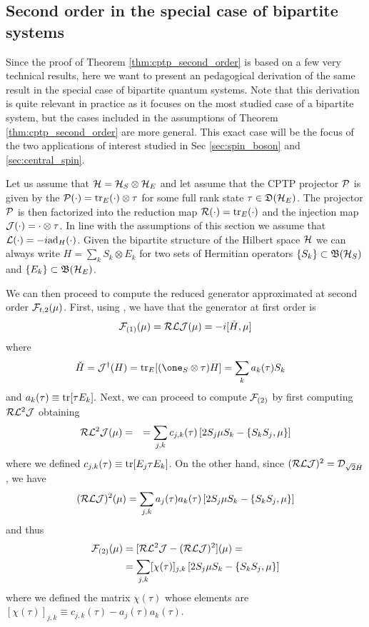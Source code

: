 \documentclass[10pt,aps,pra,twocolumn,showpacs,superscriptaddress,nobalancelastpage,notitlepage,nofootinbib,longbibliography]{revtex4-2}
\begin{document}
\subsection{Second order in the special case of bipartite systems}
\label{sec:second_order_bipartite}
Since the proof of Theorem \ref{thm:cptp_second_order} is based on a few very technical results, here we want to present an pedagogical derivation of the same result in the special case of bipartite quantum systems. Note that this derivation is quite relevant in practice as it focuses on the most studied case of a bipartite system, but the cases included in the assumptions of Theorem \ref{thm:cptp_second_order} are more general. This exact case will be the focus of the two applications of interest studied in Sec \ref{sec:spin_boson} and \ref{sec:central_spin}.

Let us assume that $\mathcal{H} = \mathcal{H}_S\otimes\mathcal{H}_E$ and let assume that the CPTP projector $\mathcal{P}$ is given by the $\mathcal{P}(\cdot) = {\rm tr}_E(\cdot)\otimes\tau$ for some full rank state $\tau\in\mathfrak{D}(\mathcal{H}_E)$. The projector $\mathcal{P}$ is then factorized into the reduction map $\mathcal{R}(\cdot) = {\rm tr}_E(\cdot)$ and the injection map $\mathcal{J}(\cdot) = \cdot\otimes \tau$. 
In line with the assumptions of this section we assume that $\mathcal{L}(\cdot) = -i {\rm ad}_H(\cdot)$. Given the bipartite structure of the Hilbert space $\mathcal{H}$ we can always write $H = \sum_k S_k \otimes E_k$ for two sets of Hermitian operators $\{S_k\}\subset\mathfrak{B}(\mathcal{H}_S)$ and $\{E_k\}\subset\mathfrak{B}(\mathcal{H}_E)$.

We can then proceed to compute the reduced generator approximated at second order $\mathcal{F}_{t,2}(\mu)$. First, using \cite[Proposition 5]{grigoletto2024exact}, we have that the generator at first order is \[\mathcal{F}_{(1)}(\mu) = \mathcal{R} \mathcal{L} \mathcal{J}(\mu) = -i[\check{H},\mu]\] where
\begin{align*}
    \check{H} &= \Jc^\dag(H) = \tr_{E}[(\one_S\otimes\tau) H]
    = \sum_k a_k(\tau) S_k
\end{align*}
and $a_k(\tau) \equiv {\rm tr}[\tau E_k]. $ Next, we can proceed to compute $\mathcal{F}_{(2)}$ by first computing $\mathcal{R} \mathcal{L}^2 \mathcal{J}$ obtaining 
\begin{align*}
    \mathcal{R} \mathcal{L}^2 \mathcal{J}(\mu) &= &= \sum_{j,k} c_{j,k}(\tau) \left[2S_j \mu S_k - \{ S_kS_j, \mu\}  \right]
\end{align*}
where we defined $c_{j,k}(\tau) \equiv {\rm tr}[ E_j\tau E_k]$.
On the other hand, since $(\mathcal{R}\mathcal{L}\mathcal{J})^2 = \mathcal{D}_{\sqrt{2}\check{H}}$, we have
\begin{align*}
    (\mathcal{R}\mathcal{L}\mathcal{J})^2(\mu) = \sum_{j,k}  a_j(\tau)a_k(\tau) \left[ 2 S_j \mu S_k - \{S_kS_j,\mu\} \right]
\end{align*}
and thus 
\begin{align*}
    \mathcal{F}_{(2)}(\mu)&=[\mathcal{R} \mathcal{L}^2 \mathcal{J}  - (\mathcal{R}\mathcal{L}\mathcal{J})^2](\mu) =\\ &=\sum_{j,k} [\chi(\tau)]_{j,k} \left[2S_j \mu S_k -  \{ S_kS_j, \mu\}  \right]
\end{align*}
where we defined the matrix $\chi(\tau)$ whose elements are $[\chi(\tau)]_{j,k} \equiv c_{j,k}(\tau)-a_j(\tau)a_k(\tau)$.
\end{document}
